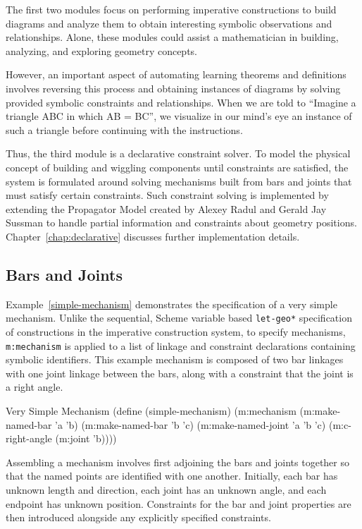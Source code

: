 The first two modules focus on performing imperative constructions to
build diagrams and analyze them to obtain interesting symbolic
observations and relationships. Alone, these modules could assist a
mathematician in building, analyzing, and exploring geometry
concepts.

However, an important aspect of automating learning theorems and
definitions involves reversing this process and obtaining instances of
diagrams by solving provided symbolic constraints and
relationships. When we are told to ``Imagine a triangle ABC in which
AB = BC'', we visualize in our mind's eye an instance of such a
triangle before continuing with the instructions.

Thus, the third module is a declarative constraint solver. To model
the physical concept of building and wiggling components until
constraints are satisfied, the system is formulated around solving
mechanisms built from bars and joints that must satisfy certain
constraints. Such constraint solving is implemented by extending the
Propagator Model created by Alexey Radul and Gerald Jay Sussman
\cite{gjs-propagator} to handle partial information and constraints
about geometry positions. Chapter~\ref{chap:declarative} discusses
further implementation details.

\subsection{Bars and Joints}

Example~\ref{simple-mechanism} demonstrates the specification of a
very simple mechanism. Unlike the sequential, Scheme variable based
\texttt{let-geo*} specification of constructions in the imperative
construction system, to specify mechanisms, \texttt{m:mechanism} is
applied to a list of linkage and constraint declarations containing
symbolic identifiers.  This example mechanism is composed of two bar
linkages with one joint linkage between the bars, along with a
constraint that the joint is a right angle.

\begin{code-example}
[label=simple-mechanism]
{Very Simple Mechanism}
(define (simple-mechanism)
  (m:mechanism
   (m:make-named-bar 'a 'b)
   (m:make-named-bar 'b 'c)
   (m:make-named-joint 'a 'b 'c)
   (m:c-right-angle (m:joint 'b))))
\end{code-example}

Assembling a mechanism involves first adjoining the bars and joints
together so that the named points are identified with one another.
Initially, each bar has unknown length and direction, each joint has
an unknown angle, and each endpoint has unknown position. Constraints
for the bar and joint properties are then introduced alongside any
explicitly specified constraints.

